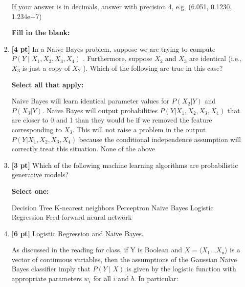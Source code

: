 \documentclass[11pt,addpoints,answers]{exam}
\begin{document}
\begin{enumerate}
    If your answer is in decimals, answer with precision 4, e.g. (6.051, 0.1230, 1.234e+7)

    \textbf{Fill in the blank:}
    
    \begin{tcolorbox}[fit,height=1cm, width=4cm, blank, borderline={1pt}{-2pt},nobeforeafter]
    
    \end{tcolorbox}
    
    
    \item \textbf{[4 pt]} In a Naive Bayes problem, suppose we are trying to compute $P(Y\mid X_1,X_2,X_3,X_4)$ .  Furthermore, suppose  $X_2$  and  $X_3$  are identical (i.e., $X_3$  is just a copy of $X_2$ ).  Which of the following are true in this case?

    \textbf{Select all that apply:}
    {\checkboxchar{$\Box$} \checkedchar{$\blacksquare$}
    \begin{checkboxes}
        \choice Naive Bayes will learn identical parameter values for $P(X_2|Y)$ and $P(X_3|Y)$.
        \choice Naive Bayes will output probabilities $P(Y|X_1,X_2,X_3,X_4)$ that are closer to 0 and 1 than they would be if we removed the feature corresponding to $X_3$.
        \choice This will not raise a problem in the output  $P(Y|X_1,X_2,X_3,X_4)$ because the conditional independence assumption will correctly treat this situation.
        \choice None of the above
    \end{checkboxes}
    }
    
    \item \textbf{[3 pt]} Which of the following machine learning algorithms are probabilistic generative models?

    \textbf{Select one:}
    \begin{checkboxes}
        \choice Decision Tree
        \choice K-nearest neighbors
        \choice Perceptron
        \choice Naive Bayes
        \choice Logistic Regression
        \choice Feed-forward neural network
    \end{checkboxes}
    

\clearpage

\item \textbf{[6 pt]} Logistic Regression and Naive Bayes. 

As discussed in the reading for class, if Y is Boolean and $X = \langle{X_{1}...X_{n}}\rangle$ is a vector of continuous variables, then the assumptions of the Gaussian Naive Bayes classifier imply that $P(Y \mid X)$ is given by the logistic function with
appropriate parameters $w_i$ for all $i$ and $b$. In particular:


\end{enumerate}
\end{document}
